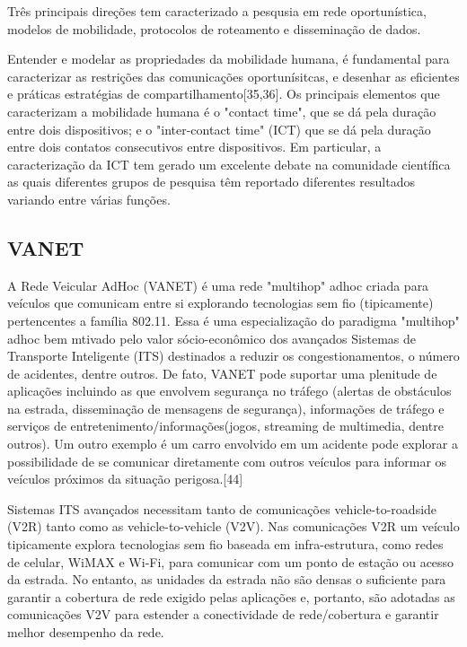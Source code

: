 \documentclass[12pt, %
openright, 
oneside, %
a4paper,    %
brazil]{facom-ufu-abntex2}
\begin{document}
Três principais direções tem caracterizado a pesqusia em rede oportunística, modelos de mobilidade, protocolos de roteamento e disseminação de dados.

Entender e modelar as propriedades da mobilidade humana, é fundamental para caracterizar as restrições das comunicações oportunísitcas, e desenhar as eficientes e práticas estratégias de compartilhamento[35,36]. Os principais elementos que caracterizam a mobilidade humana é o "contact time", que se dá pela duração entre dois dispositivos; e o "inter-contact time" (ICT) que se dá pela duração entre dois contatos consecutivos entre dispositivos. Em particular, a caracterização da ICT tem gerado um excelente debate na comunidade científica as quais diferentes grupos de pesquisa têm reportado diferentes resultados variando entre várias funções.
\subsection{VANET}

A Rede Veicular AdHoc (VANET) é uma rede "multihop" adhoc criada para veículos que comunicam entre si explorando tecnologias sem fio (tipicamente) pertencentes a família 802.11. Essa é uma especialização do paradigma "multihop" adhoc bem mtivado pelo valor sócio-econômico dos avançados Sistemas de Transporte Inteligente (ITS) destinados a reduzir os congestionamentos, o número de acidentes, dentre outros. De fato, VANET pode suportar uma plenitude de aplicações incluindo as que envolvem segurança no tráfego (alertas de obstáculos na estrada, disseminação de mensagens de segurança), informações de tráfego e serviços de entretenimento/informações(jogos, streaming de multimedia, dentre outros). Um outro exemplo é um carro envolvido em um acidente pode explorar a possibilidade de se comunicar diretamente com outros veículos para informar os veículos próximos da situação perigosa.[44]

Sistemas ITS avançados necessitam tanto de comunicações vehicle-to-roadside (V2R) tanto como as vehicle-to-vehicle (V2V). Nas comunicações V2R um veículo tipicamente explora tecnologias sem fio baseada em infra-estrutura, como redes de celular, WiMAX e Wi-Fi, para comunicar com um ponto de estação ou acesso da estrada. No entanto, as unidades da estrada não são densas o suficiente para garantir a cobertura de rede exigido pelas aplicações e, portanto, são adotadas as comunicações V2V para estender a conectividade de rede/cobertura e garantir melhor desempenho da rede. 
\end{document}
